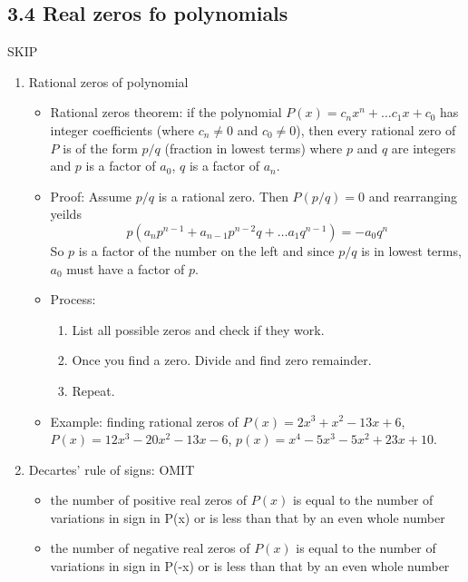 \documentclass{article}
\begin{document}
\subsection{3.4 Real zeros fo polynomials}


SKIP

\begin{enumerate}
\item Rational zeros of polynomial
\begin{itemize}

\item Rational zeros theorem: if the polynomial $P(x)=c_nx^n + \dots c_1x + c_0$ has integer coefficients (where $c_n\neq 0$ and $c_0 \neq 0$), then every rational zero of $P$ is of the form $p/q$ (fraction in lowest terms)
where $p$ and $q$ are integers and $p$ is a factor of $a_0$, $q$ is a factor of $a_n$.
\item Proof: Assume $p/q$ is a rational zero. Then $P(p/q)=0$ and rearranging yeilds
\[
p(a_np^{n-1} + a_{n-1}p^{n-2}q +  \dots a_1 q^{n-1}) = -a_0q^n
\]
So $p$ is a factor of the number on the left and since $p/q$ is in lowest terms, $a_0$ must have a factor of $p$.

\item Process: 
\begin{enumerate}
\item List all possible zeros and check if they work. 
\item Once you find a zero. Divide and find zero remainder.
\item Repeat.
\end{enumerate}
\item Example: finding rational zeros of $P(x) = 2x^3 + x^2 -13x + 6$, $P(x)=12x^3-20x^2-13x-6$, $p(x)=x^4-5x^3-5x^2+23x+10$.
\end{itemize}

\item Decartes' rule of signs: OMIT
\begin{itemize}
\item the number of positive real zeros of $P(x)$ is equal to the number of variations in sign in P(x) or is less than that by an even whole number
\item the number of negative real zeros of $P(x)$ is equal to the number of variations in sign in P(-x) or is less than that by an even whole number
\end{itemize}


\end{enumerate}
\end{document}
